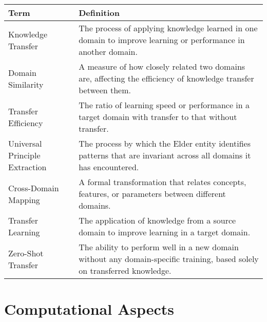 \begin{center}
\begin{tabular}{|l|p{12cm}|}
\hline
\textbf{Term} & \textbf{Definition} \\
\hline
Knowledge Transfer & The process of applying knowledge learned in one domain to improve learning or performance in another domain. \\
\hline
Domain Similarity & A measure of how closely related two domains are, affecting the efficiency of knowledge transfer between them. \\
\hline
Transfer Efficiency & The ratio of learning speed or performance in a target domain with transfer to that without transfer. \\
\hline
Universal Principle Extraction & The process by which the Elder entity identifies patterns that are invariant across all domains it has encountered. \\
\hline
Cross-Domain Mapping & A formal transformation that relates concepts, features, or parameters between different domains. \\
\hline
Transfer Learning & The application of knowledge from a source domain to improve learning in a target domain. \\
\hline
Zero-Shot Transfer & The ability to perform well in a new domain without any domain-specific training, based solely on transferred knowledge. \\
\hline
\end{tabular}
\label{tab:transfer_terminology}
\end{center}

\section{Computational Aspects}

